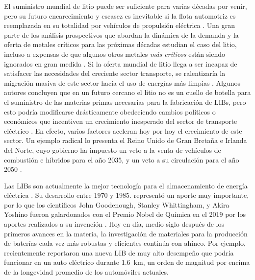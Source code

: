 El suministro mundial de litio puede ser suficiente para varias décadas por venir, pero su futuro encarecimiento y escasez es inevitable si la flota automotriz es reemplazada en su totalidad por vehículos de propulsión eléctrica \citep{SVERDRUP2016}. Una gran parte de los análisis prospectivos que abordan la dinámica de la demanda y la oferta de metales críticos para las próximas décadas estudian el caso del litio, incluso a expensas de que algunos otros metales \textit{más críticos} están siendo ignorados en gran medida \citep{Watari2020}. Si la oferta mundial de litio llega a ser incapaz de satisfacer las necesidades del creciente sector transporte, se ralentizaría la migración masiva de este sector hacia el uso de energías más limpias \citep{VIKSTROM2013}. Algunos autores concluyen que en un futuro cercano el litio no es un cuello de botella para el suministro de las materias primas necesarias para la fabricación de \acp{LIB}, pero esto podría modificarse drásticamente obedeciendo cambios políticos o económicos que incentiven un crecimiento inesperado del sector de transporte eléctrico \citep{Olivetti2017}. En efecto, varios factores aceleran hoy por hoy el crecimiento de este sector. Un ejemplo radical lo presenta el Reino Unido de Gran Bretaña e Irlanda del Norte, cuyo gobierno ha impuesto un veto a la venta de vehículos de combustión e híbridos para el año 2035, y un veto a su circulación para el año 2050 \citep{BBC2020}.

Las \acp{LIB} son actualmente la mejor tecnología para el almacenamiento de energía eléctrica \citep{Zubi2018}. Su desarrollo entre 1970 y 1985. representó un aporte muy importante, por lo que los científicos John Goodenough, Stanley Whittingham, y Akira Yoshino fueron galardonados con el Premio Nobel de Química en el 2019 por los aportes realizados a su invención \citep{Royal2019}. Hoy en día, medio siglo después de los primeros avances en la materia, la investigación de materiales para la producción de baterías cada vez más robustas y eficientes continúa con ahínco. Por ejemplo, recientemente \citet{Harlow2019} reportaron una nueva \ac{LIB} de muy alto desempeño que podría funcionar en un auto eléctrico durante 1.6~km, un orden de magnitud por encima de la longevidad promedio de los automóviles actuales.%

\clearpage
